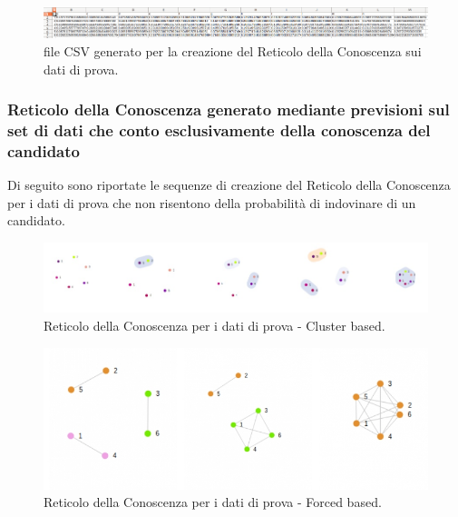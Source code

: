 \noindent
\begin{figure}[H]
\centering
	\includegraphics[width=1\linewidth]{./image/fileCSV_rete-prova.png}
	\caption{file CSV generato per la creazione del Reticolo della Conoscenza sui dati di prova.}
	\label{file CSV generato per la creazione del Reticolo della Conoscenza sui dati di prova.}
\end{figure}
\noindent

\subsubsection{Reticolo della Conoscenza generato mediante previsioni sul set di dati che conto esclusivamente della conoscenza del candidato}
\label{Reticolo della Conoscenza generato mediante previsioni sul set di dati che tiene conto esclusivamente della conoscenza del candidato}

Di seguito sono riportate le sequenze di creazione del Reticolo della Conoscenza per i dati di prova che non risentono della probabilit\`a di indovinare di un candidato.
\noindent

\begin{figure}[H]
\centering
	\includegraphics[width=1.20\linewidth]{./image/collage_reticolo-general-cluster.png}
	\caption{Reticolo della Conoscenza per i dati di prova - Cluster based.}
	\label{Reticolo della Conoscenza per i dati di prova - Cluster based.}
\end{figure}
\noindent

\begin{figure}[H]
\centering
	\includegraphics[width=1\linewidth]{./image/collage_reticolo-general-forced.png}
	\caption{Reticolo della Conoscenza per i dati di prova - Forced based.}
	\label{Reticolo della Conoscenza per i dati di prova - Forced based.}
\end{figure}
\noindent

